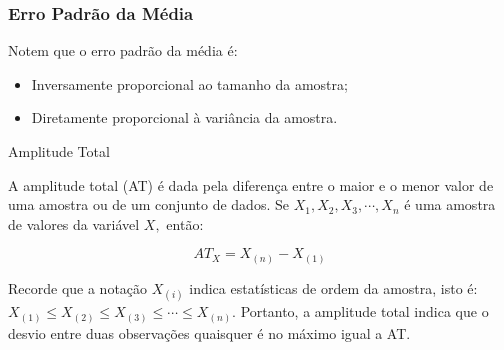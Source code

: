 \documentclass[14pt,aspectratio=1610]{beamer}
\begin{document}
\begin{frame}{}
\frametitle{Erro Padrão da Média}
    \begin{block}{}
    Notem que o erro padrão da média é:
\begin{itemize}
    \item Inversamente proporcional ao tamanho da amostra;
    \item Diretamente proporcional à variância da amostra.
\end{itemize}
    \end{block}
\end{frame}

\begin{frame}{Amplitude Total}
\begin{block}{}
\justifying
A amplitude total (AT) é dada pela diferença entre o maior e o menor valor de uma amostra ou de um conjunto de dados. Se $X_1, X_2, X_3, \cdots , X_n$ é uma amostra de valores da variável $X,$ então:

$$AT_X = X_{(n)} - X_{(1)}$$

Recorde que a notação $X_{(i)}$ indica estatísticas de ordem da amostra, isto é: $X_{(1)} \leq X_{(2)} \leq X_{(3)} \leq \cdots \leq X_{(n)}.$ Portanto, a amplitude total indica que o desvio entre duas observações quaisquer é no máximo igual a AT.
\end{block}
\nocite{Morettin09, Apostila, eric, montgomery2016, Bastos2025}
\end{frame}

\begin{frame}[allowframebreaks]
\frametitle{}
\printbibliography
\end{frame}
\end{document}
